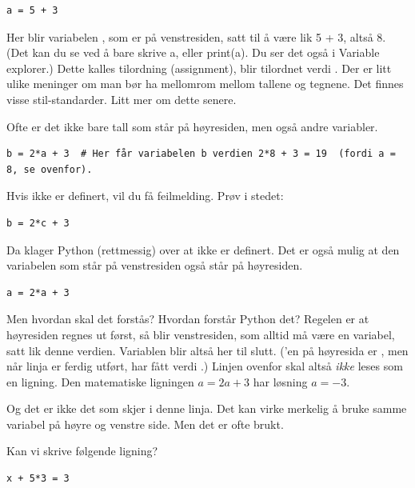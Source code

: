 \begin{lstlisting}
a = 5 + 3
\end{lstlisting}

Her blir variabelen , som er på venstresiden, satt til å være lik 5 + 3, altså 8. (Det kan du se ved å bare skrive a, eller print(a). Du ser det også i Variable explorer.) Dette kalles tilordning (assignment),  blir tilordnet verdi . Der er litt ulike meninger om man bør ha mellomrom mellom tallene og tegnene. Det finnes visse stil-standarder. Litt mer om dette senere. 

Ofte er det ikke bare tall som står på høyresiden, men også andre variabler. 

\begin{lstlisting}
b = 2*a + 3  # Her får variabelen b verdien 2*8 + 3 = 19  (fordi a = 8, se ovenfor).
\end{lstlisting}

Hvis  ikke er definert, vil du få feilmelding. Prøv i stedet: 

\begin{lstlisting}
b = 2*c + 3 
\end{lstlisting}

Da klager Python (rettmessig) over at  ikke er definert. Det er også mulig at den variabelen som står på venstresiden også står på høyresiden.

\begin{lstlisting}
a = 2*a + 3
\end{lstlisting}

Men hvordan skal det forstås? Hvordan forstår Python det? Regelen er at høyresiden regnes ut først, så blir venstresiden, som alltid må være en variabel, satt lik denne verdien. Variablen  blir altså her  til slutt. ('en på høyresida er , men når linja er ferdig utført, har  fått verdi .) Linjen ovenfor skal altså {\em ikke} leses som en ligning. Den matematiske ligningen $a = 2a + 3$ har løsning $a = -3$.

Og det er ikke det som skjer i denne linja. Det kan virke merkelig å bruke samme variabel på høyre og venstre side. Men det er ofte brukt. 

Kan vi skrive følgende ligning?

\begin{lstlisting}
x + 5*3 = 3
\end{lstlisting}


